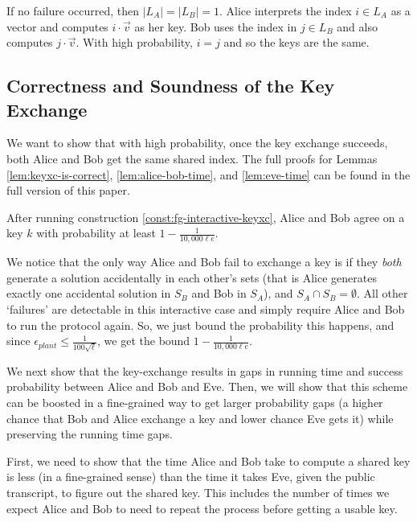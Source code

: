 \begin{construction}
\begin{itemize}
		If no failure occurred, then $|L_A| = |L_B| = 1$. Alice interprets the index $i \in L_A$ as a vector and computes $i \cdot \vec v$ as her key. Bob uses the index in $j \in L_B$ and also computes $j \cdot \vec v$. With high probability, $i = j$ and so the keys are the same.
	\end{itemize}
\end{construction}


\subsection{Correctness and Soundness of the Key Exchange}
We want to show that with high probability, once the key exchange succeeds, both Alice and Bob get the same shared index. The full proofs for Lemmas \ref{lem:keyxc-is-correct}, \ref{lem:alice-bob-time}, and \ref{lem:eve-time} can be found in the full version of this paper.

\begin{lemma}\label{lem:keyxc-is-correct}
	After running construction \ref{const:fg-interactive-keyxc}, Alice and Bob agree on a key $k$ with probability at least $1 - \frac{1}{10,000 \ell e}$.
\end{lemma}
\begin{proof-sketch}
	We notice that the only way Alice and Bob fail to exchange a key is if they \emph{both} generate a solution accidentally in each other's sets (that is Alice generates exactly one accidental solution in $S_B$ and Bob in $S_A$), and $S_A \cap S_B = \emptyset$. All other `failures' are detectable in this interactive case and simply require Alice and Bob to run the protocol again. So, we just bound the probability this happens, and since $\epsilon_{plant} \le \frac{1}{100 \sqrt \ell}$, we get the bound $1 - \frac{1}{10,000 \ell e}$.%
\end{proof-sketch}

We next show that the key-exchange results in gaps in running time and success probability between Alice and Bob and Eve. Then, we will show that this scheme can be boosted in a fine-grained way to get larger probability gaps (a higher chance that Bob and Alice exchange a key and lower chance Eve gets it) while preserving the running time gaps. 

First, we need to show that the time Alice and Bob take to compute a shared key is less (in a fine-grained sense) than the time it takes Eve, given the public transcript, to figure out the shared key. This includes the number of times we expect Alice and Bob to need to repeat the process before getting a usable key.

